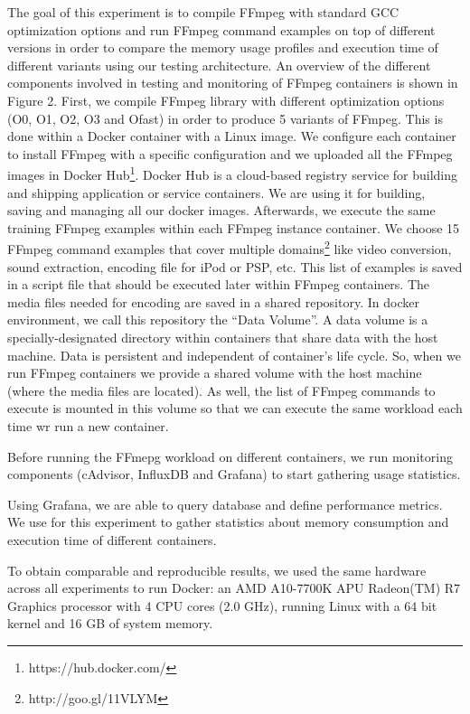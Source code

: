 The goal of this experiment is to compile FFmpeg with standard GCC optimization options and run FFmpeg command examples on top of different versions in order to compare the memory usage profiles and execution time of different variants using our testing architecture. An overview of the different components involved in testing and monitoring of FFmpeg containers is shown in Figure 2. 
First, we compile FFmpeg library with different optimization options  (O0, O1, O2, O3 and Ofast) in order to produce 5 variants of FFmpeg. This is done within a Docker container with a Linux image. We configure
each container to install FFmpeg with a specific configuration and we uploaded all the FFmpeg images in Docker Hub\footnote{https://hub.docker.com/}.
Docker Hub is a cloud-based registry service for building and shipping application or
service containers. We are using it for building, saving and managing all our docker
images.
 Afterwards, we execute the same training FFmpeg examples within each FFmpeg instance container. We choose 15 FFmpeg command examples that cover multiple domains\footnote{http://goo.gl/11VLYM} like video conversion, sound extraction, encoding file for iPod or PSP, etc. This list of examples is saved in a script file that should be executed later within FFmpeg containers. The media files needed for encoding are saved in a shared repository. In docker environment, we call this repository the “Data Volume”. A data volume is a specially-designated directory within containers that share data with the host machine. Data is persistent and independent of container's life cycle. So, when we run FFmpeg containers we provide a shared volume with the host
machine (where the media files are located). As well, the list of FFmpeg commands to execute is mounted in this volume so that we can execute the same workload each time wr run a new container.

Before running the FFmepg workload on different containers, we run monitoring components (cAdvisor, InfluxDB and Grafana) to start gathering usage statistics.

Using Grafana, we are able to query database and define performance metrics. We use for this experiment to gather statistics about memory consumption and execution time of different containers. 

To obtain comparable and reproducible results, we used the same hardware across all experiments to run Docker: an AMD A10-7700K APU Radeon(TM) R7 Graphics processor with 4 CPU cores (2.0 GHz), running Linux with a 64 bit kernel and 16 GB of system memory.

